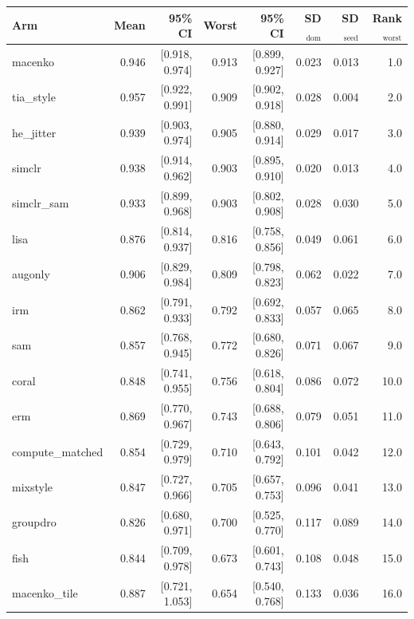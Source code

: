 \begin{tabular}{lrrrrrrr}
\toprule
Arm & Mean & 95\% CI & Worst & 95\% CI & SD$_\text{dom}$ & SD$_\text{seed}$ & Rank$_\text{worst}$ \\
\midrule
macenko & 0.946 & [0.918, 0.974] & 0.913 & [0.899, 0.927] & 0.023 & 0.013 & 1.0 \\
tia\_style & 0.957 & [0.922, 0.991] & 0.909 & [0.902, 0.918] & 0.028 & 0.004 & 2.0 \\
he\_jitter & 0.939 & [0.903, 0.974] & 0.905 & [0.880, 0.914] & 0.029 & 0.017 & 3.0 \\
simclr & 0.938 & [0.914, 0.962] & 0.903 & [0.895, 0.910] & 0.020 & 0.013 & 4.0 \\
simclr\_sam & 0.933 & [0.899, 0.968] & 0.903 & [0.802, 0.908] & 0.028 & 0.030 & 5.0 \\
lisa & 0.876 & [0.814, 0.937] & 0.816 & [0.758, 0.856] & 0.049 & 0.061 & 6.0 \\
augonly & 0.906 & [0.829, 0.984] & 0.809 & [0.798, 0.823] & 0.062 & 0.022 & 7.0 \\
irm & 0.862 & [0.791, 0.933] & 0.792 & [0.692, 0.833] & 0.057 & 0.065 & 8.0 \\
sam & 0.857 & [0.768, 0.945] & 0.772 & [0.680, 0.826] & 0.071 & 0.067 & 9.0 \\
coral & 0.848 & [0.741, 0.955] & 0.756 & [0.618, 0.804] & 0.086 & 0.072 & 10.0 \\
erm & 0.869 & [0.770, 0.967] & 0.743 & [0.688, 0.806] & 0.079 & 0.051 & 11.0 \\
compute\_matched & 0.854 & [0.729, 0.979] & 0.710 & [0.643, 0.792] & 0.101 & 0.042 & 12.0 \\
mixstyle & 0.847 & [0.727, 0.966] & 0.705 & [0.657, 0.753] & 0.096 & 0.041 & 13.0 \\
groupdro & 0.826 & [0.680, 0.971] & 0.700 & [0.525, 0.770] & 0.117 & 0.089 & 14.0 \\
fish & 0.844 & [0.709, 0.978] & 0.673 & [0.601, 0.743] & 0.108 & 0.048 & 15.0 \\
macenko\_tile & 0.887 & [0.721, 1.053] & 0.654 & [0.540, 0.768] & 0.133 & 0.036 & 16.0 \\
\bottomrule
\end{tabular}
